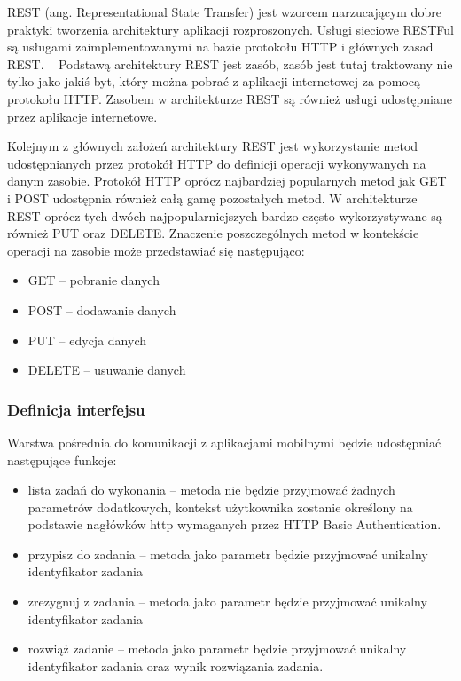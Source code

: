 REST (ang. Representational State Transfer) jest wzorcem narzucającym dobre praktyki tworzenia architektury aplikacji rozproszonych. Usługi sieciowe RESTFul  są usługami zaimplementowanymi na bazie protokołu HTTP i głównych zasad REST. ~\cite{rest}
Podstawą architektury REST jest zasób, zasób jest tutaj traktowany nie tylko jako jakiś byt, który można pobrać z aplikacji internetowej za pomocą protokołu HTTP. Zasobem w architekturze REST są również usługi udostępniane przez aplikacje internetowe.  

Kolejnym z głównych założeń architektury REST jest wykorzystanie metod udostępnianych przez protokół HTTP do definicji operacji wykonywanych na danym zasobie. Protokół HTTP oprócz najbardziej popularnych metod jak GET i POST udostępnia również całą gamę pozostałych metod. W architekturze REST oprócz tych dwóch najpopularniejszych bardzo często wykorzystywane są również PUT oraz DELETE. Znaczenie poszczególnych metod w kontekście operacji na zasobie może przedstawiać się następująco:
\begin{itemize}
\item GET -- pobranie danych
\item POST -- dodawanie danych
\item PUT -- edycja danych
\item DELETE -- usuwanie danych 
\end{itemize}


\subsubsection{Definicja interfejsu}

Warstwa pośrednia do komunikacji z aplikacjami mobilnymi będzie udostępniać następujące funkcje:

\begin{itemize}
\item lista zadań do wykonania -- metoda nie będzie przyjmować żadnych parametrów dodatkowych, kontekst użytkownika zostanie określony na podstawie nagłówków http wymaganych przez HTTP Basic Authentication. 
\item przypisz do zadania -- metoda jako parametr będzie przyjmować unikalny identyfikator zadania  
\item zrezygnuj z zadania -- metoda jako parametr będzie przyjmować unikalny identyfikator zadania  
\item rozwiąż zadanie -- metoda jako parametr będzie przyjmować unikalny identyfikator zadania  oraz wynik rozwiązania zadania. 
\end{itemize}

